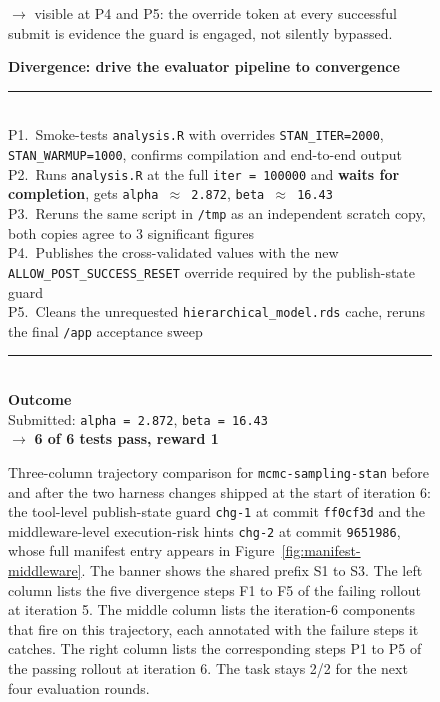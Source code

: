 \begin{figure}[t]
\begin{tcbraster}
\begin{tcolorbox}[colback=black!3,colframe=black!65,colbacktitle=black!75,
                          title={\scriptsize\textbf{Iteration 6 changes that close each gap}}]
            \textcolor{black!60}{$\rightarrow$ visible at P4 and P5: the override token at every successful submit is evidence the guard is engaged, not silently bypassed.}
        \end{tcolorbox}
        \begin{tcolorbox}[colback=aheTeal!12,colframe=aheBlue,colbacktitle=aheBlue,
                          title={\scriptsize\textbf{After iteration 6 changes, same seed, iteration 6, reward 1.0}}]
            \textbf{\textcolor{aheBlue}{Divergence: drive the evaluator pipeline to convergence}} \\
            \rule{\linewidth}{0.3pt}\\[1pt]
            P1.~Smoke-tests \texttt{analysis.R} with overrides \texttt{STAN\_ITER=2000}, \texttt{STAN\_WARMUP=1000}, confirms compilation and end-to-end output \\[2pt]
            P2.~Runs \texttt{analysis.R} at the full \texttt{iter = 100000} and \textbf{waits for completion}, gets \texttt{alpha $\approx$ 2.872}, \texttt{beta $\approx$ 16.43} \\[2pt]
            P3.~Reruns the same script in \texttt{/tmp} as an independent scratch copy, both copies agree to 3 significant figures \\[2pt]
            P4.~Publishes the cross-validated values with the new \texttt{ALLOW\_POST\_SUCCESS\_RESET} override required by the publish-state guard \\[2pt]
            P5.~Cleans the unrequested \texttt{hierarchical\_model.rds} cache, reruns the final \texttt{/app} acceptance sweep \\[3pt]
            \rule{\linewidth}{0.3pt}\\
            \textbf{\textcolor{aheBlue}{Outcome}} \\
            Submitted: \texttt{alpha = 2.872}, \texttt{beta = 16.43} \\
            $\rightarrow$ \textbf{6 of 6 tests pass, reward 1}
        \end{tcolorbox}
    \end{tcbraster}
    \caption{Three-column trajectory comparison for \texttt{mcmc-sampling-stan} before and after the two harness changes shipped at the start of iteration 6: the tool-level publish-state guard \texttt{chg-1} at commit \texttt{ff0cf3d} and the middleware-level execution-risk hints \texttt{chg-2} at commit \texttt{9651986}, whose full manifest entry appears in Figure~\ref{fig:manifest-middleware}. The banner shows the shared prefix S1 to S3. The left column lists the five divergence steps F1 to F5 of the failing rollout at iteration 5. The middle column lists the iteration-6 components that fire on this trajectory, each annotated with the failure steps it catches. The right column lists the corresponding steps P1 to P5 of the passing rollout at iteration 6. The task stays 2/2 for the next four evaluation rounds.}
    \label{fig:case-trajectory-mcmc}
\end{figure}
